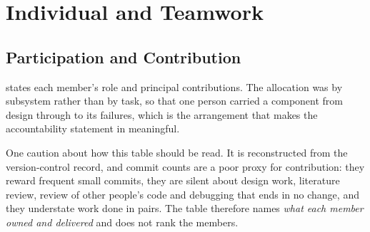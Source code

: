 \section{Individual and Teamwork}
\label{sec:team}

\subsection{Participation and Contribution}
\label{sec:participation}

 states each member's role and principal contributions. The
allocation was by subsystem rather than by task, so that one person carried a
component from design through to its failures, which is the arrangement that
makes the accountability statement in  meaningful.

One caution about how this table should be read. It is reconstructed from the
version-control record, and commit counts are a poor proxy for contribution:
they reward frequent small commits, they are silent about design work,
literature review, review of other people's code and debugging that ends in no
change, and they understate work done in pairs. The table therefore names
\emph{what each member owned and delivered} and does not rank the members.


